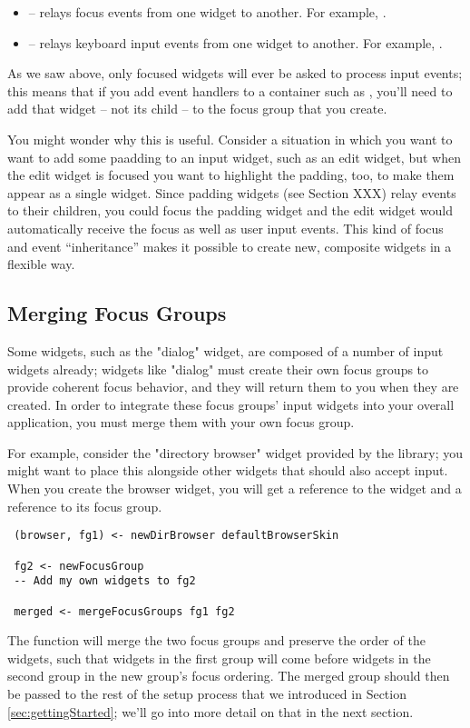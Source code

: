 \begin{itemize}
\item {} -- relays focus events from one widget to
  another.  For example, .
\item {} -- relays keyboard input events from one
  widget to another.  For example, .
\end{itemize}

As we saw above, only focused widgets will ever be asked to process
input events; this means that if you add event handlers to a container
such as , you'll need to add that widget -- not its child
-- to the focus group that you create.

You might wonder why this is useful.  Consider a situation in which
you want to want to add some paadding to an input widget, such as an
edit widget, but when the edit widget is focused you want to highlight
the padding, too, to make them appear as a single widget.  Since
padding widgets (see Section XXX) relay events to their children, you
could focus the padding widget and the edit widget would automatically
receive the focus as well as user input events.  This kind of focus
and event ``inheritance'' makes it possible to create new, composite
widgets in a flexible way.

\subsection{Merging Focus Groups}

Some widgets, such as the "dialog" widget, are composed of a number of
input widgets already; widgets like "dialog" must create their own
focus groups to provide coherent focus behavior, and they will return
them to you when they are created.  In order to integrate these focus
groups' input widgets into your overall application, you must merge
them with your own focus group.

For example, consider the "directory browser" widget provided by the
library; you might want to place this alongside other widgets that
should also accept input.  When you create the browser widget, you will
get a reference to the widget and a reference to its focus group.

\begin{verbatim}
 (browser, fg1) <- newDirBrowser defaultBrowserSkin

 fg2 <- newFocusGroup
 -- Add my own widgets to fg2

 merged <- mergeFocusGroups fg1 fg2
\end{verbatim}

The  function will merge the two focus groups and
preserve the order of the widgets, such that widgets in the first
group will come before widgets in the second group in the new group's
focus ordering.  The merged group should then be passed to the rest of
the setup process that we introduced in Section
\ref{sec:gettingStarted}; we'll go into more detail on that in the
next section.
